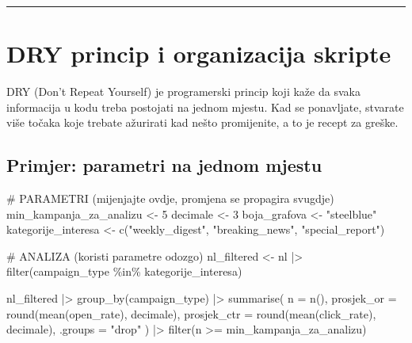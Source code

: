 \documentclass[
  croatian,
  letterpaper,
  DIV=11,
  numbers=noendperiod]{scrartcl}
\newenvironment{Shaded}{\begin{snugshade}}{\end{snugshade}}
\newcommand{\AttributeTok}[1]{\textcolor[rgb]{0.40,0.45,0.13}{#1}}
\newcommand{\CommentTok}[1]{\textcolor[rgb]{0.37,0.37,0.37}{#1}}
\newcommand{\DecValTok}[1]{\textcolor[rgb]{0.68,0.00,0.00}{#1}}
\newcommand{\FunctionTok}[1]{\textcolor[rgb]{0.28,0.35,0.67}{#1}}
\newcommand{\NormalTok}[1]{\textcolor[rgb]{0.00,0.23,0.31}{#1}}
\newcommand{\OtherTok}[1]{\textcolor[rgb]{0.00,0.23,0.31}{#1}}
\newcommand{\SpecialCharTok}[1]{\textcolor[rgb]{0.37,0.37,0.37}{#1}}
\newcommand{\StringTok}[1]{\textcolor[rgb]{0.13,0.47,0.30}{#1}}
\begin{document}
\begin{center}\rule{0.5\linewidth}{0.5pt}\end{center}

\section{DRY princip i organizacija skripte}\label{sec-dry}

DRY (Don't Repeat Yourself) je programerski princip koji kaže da svaka
informacija u kodu treba postojati na jednom mjestu. Kad se ponavljate,
stvarate više točaka koje trebate ažurirati kad nešto promijenite, a to
je recept za greške.

\subsection{Primjer: parametri na jednom
mjestu}\label{primjer-parametri-na-jednom-mjestu}

\begin{Shaded}
\begin{Highlighting}[]
\CommentTok{\# PARAMETRI (mijenjajte ovdje, promjena se propagira svugdje)}
\NormalTok{min\_kampanja\_za\_analizu }\OtherTok{\textless{}{-}} \DecValTok{5}
\NormalTok{decimale }\OtherTok{\textless{}{-}} \DecValTok{3}
\NormalTok{boja\_grafova }\OtherTok{\textless{}{-}} \StringTok{"steelblue"}
\NormalTok{kategorije\_interesa }\OtherTok{\textless{}{-}} \FunctionTok{c}\NormalTok{(}\StringTok{"weekly\_digest"}\NormalTok{, }\StringTok{"breaking\_news"}\NormalTok{, }\StringTok{"special\_report"}\NormalTok{)}

\CommentTok{\# ANALIZA (koristi parametre odozgo)}
\NormalTok{nl\_filtered }\OtherTok{\textless{}{-}}\NormalTok{ nl }\SpecialCharTok{|\textgreater{}}
  \FunctionTok{filter}\NormalTok{(campaign\_type }\SpecialCharTok{\%in\%}\NormalTok{ kategorije\_interesa)}

\NormalTok{nl\_filtered }\SpecialCharTok{|\textgreater{}}
  \FunctionTok{group\_by}\NormalTok{(campaign\_type) }\SpecialCharTok{|\textgreater{}}
  \FunctionTok{summarise}\NormalTok{(}
    \AttributeTok{n =} \FunctionTok{n}\NormalTok{(),}
    \AttributeTok{prosjek\_or =} \FunctionTok{round}\NormalTok{(}\FunctionTok{mean}\NormalTok{(open\_rate), decimale),}
    \AttributeTok{prosjek\_ctr =} \FunctionTok{round}\NormalTok{(}\FunctionTok{mean}\NormalTok{(click\_rate), decimale),}
    \AttributeTok{.groups =} \StringTok{"drop"}
\NormalTok{  ) }\SpecialCharTok{|\textgreater{}}
  \FunctionTok{filter}\NormalTok{(n }\SpecialCharTok{\textgreater{}=}\NormalTok{ min\_kampanja\_za\_analizu)}
\end{Highlighting}
\end{Shaded}
\end{document}
